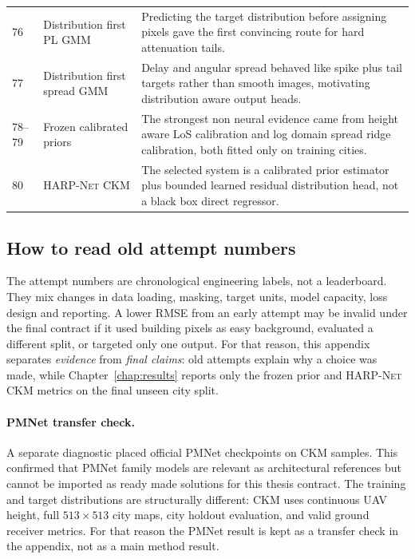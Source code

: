 \begin{table}[htbp]
\begin{tabularx}{\textwidth}{p{}p{}X}
76 & Distribution first PL GMM & Predicting the target distribution before assigning pixels gave the first convincing route for hard attenuation tails. \\
77 & Distribution first spread GMM & Delay and angular spread behaved like spike plus tail targets rather than smooth images, motivating distribution aware output heads. \\
78--79 & Frozen calibrated priors & The strongest non neural evidence came from height aware LoS calibration and log domain spread ridge calibration, both fitted only on training cities. \\
80 & \textsc{HARP-Net CKM} & The selected system is a calibrated prior estimator plus bounded learned residual distribution head, not a black box direct regressor. \\
\bottomrule
\end{tabularx}
\end{table}

\subsection{How to read old attempt numbers}

The attempt numbers are chronological engineering labels, not a leaderboard.
They mix changes in data loading, masking, target units, model capacity, loss
design and reporting. A lower RMSE from an early attempt may be invalid under
the final contract if it used building pixels as easy background, evaluated a
different split, or targeted only one output. For that reason, this appendix
separates \emph{evidence} from \emph{final claims}: old attempts explain why a
choice was made, while Chapter~\ref{chap:results} reports only the frozen prior
and \textsc{HARP-Net CKM} metrics on the final unseen city split.

\paragraph{PMNet transfer check.}
A separate diagnostic placed official PMNet checkpoints on CKM samples. This
confirmed that PMNet family models are relevant as architectural references but
cannot be imported as ready made solutions for this thesis contract. The
training and target distributions are structurally different: CKM uses
continuous UAV height, full \(513\times513\) city maps, city holdout
evaluation, and valid ground receiver metrics. For that reason the PMNet result
is kept as a transfer check in the appendix, not as a main method result.

